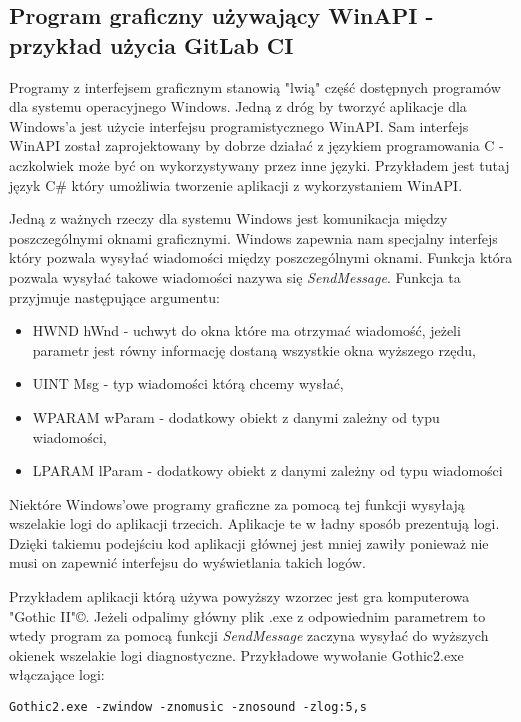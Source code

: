 \subsection{Program graficzny używający WinAPI - przykład użycia GitLab CI}
Programy z interfejsem graficznym stanowią "lwią" część dostępnych programów dla systemu operacyjnego Windows. Jedną z dróg by tworzyć aplikacje dla Windows'a jest użycie interfejsu programistycznego WinAPI. Sam interfejs WinAPI został zaprojektowany by dobrze działać z językiem programowania C - \cite{WinAPI} aczkolwiek może być on wykorzystywany przez inne języki. Przykładem jest tutaj język C\# który umożliwia tworzenie aplikacji z wykorzystaniem WinAPI. 
\par
Jedną z ważnych rzeczy dla systemu Windows jest komunikacja między poszczególnymi oknami graficznymi. Windows zapewnia nam specjalny interfejs który pozwala wysyłać wiadomości między poszczególnymi oknami. Funkcja która pozwala wysyłać takowe wiadomości nazywa się \textit{SendMessage}. Funkcja ta przyjmuje następujące argumentu:
\begin{itemize}
  \item HWND hWnd - uchwyt do okna które ma otrzymać wiadomość, jeżeli parametr jest równy informację dostaną wszystkie okna wyższego rzędu,
  \item UINT Msg - typ wiadomości którą chcemy wysłać,
  \item WPARAM wParam - dodatkowy obiekt z danymi zależny od typu wiadomości,
  \item LPARAM lParam - dodatkowy obiekt z danymi zależny od typu wiadomości
\end{itemize}
Niektóre Windows'owe programy graficzne za pomocą tej funkcji wysyłają wszelakie logi do aplikacji trzecich. Aplikacje te w ładny sposób prezentują logi. Dzięki takiemu podejściu kod aplikacji głównej jest mniej zawiły ponieważ nie musi on zapewnić interfejsu do wyświetlania takich logów.
\par
Przykładem aplikacji którą używa powyższy wzorzec jest gra komputerowa "Gothic II"©. Jeżeli odpalimy główny plik .exe z odpowiednim parametrem to wtedy program za pomocą funkcji \textit{SendMessage} zaczyna wysyłać do wyższych okienek wszelakie logi diagnostyczne. Przykładowe wywołanie Gothic2.exe włączające logi:
\begin{lstlisting}[caption={Gra Gothic włącza się w trybie okienkowym, bez muzyki i dźwięków oraz z wysyłaniem logów}]
  Gothic2.exe -zwindow -znomusic -znosound -zlog:5,s
\end{lstlisting}
